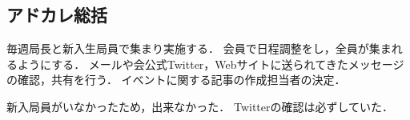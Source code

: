 \subsection*{アドカレ総括}


毎週局長と新入生局員で集まり実施する．
会員で日程調整をし，全員が集まれるようにする．
メールや会公式Twitter，Webサイトに送られてきたメッセージの確認，共有を行う．
イベントに関する記事の作成担当者の決定．


新入局員がいなかったため，出来なかった．
Twitterの確認は必ずしていた．
